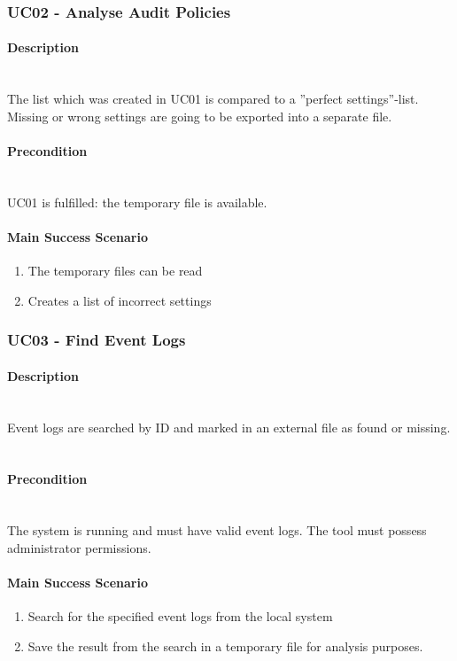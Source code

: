 \subsubsection{UC02 - Analyse Audit Policies}\label{UC02}
\begin{tcolorbox}
    \paragraph{Description} \ \\
    The list which was created in UC01 is compared to a ''perfect settings''-list. Missing or wrong settings are going to be exported into a separate file.
    \ \\
    \paragraph{Precondition} \ \\
    UC01 is fulfilled: the temporary file is available.
    \ \\
    \paragraph{Main Success Scenario} 
    \begin{enumerate}
        \item The temporary files can be read
        \item Creates a list of incorrect settings
    \end{enumerate}   
\end{tcolorbox}
\subsubsection{UC03 - Find Event Logs}\label{UC03}
\begin{tcolorbox}
    \paragraph{Description} \ \\
    Event logs are searched by ID and marked in an external file as found or missing.
    \ \\
    \paragraph{Precondition} \ \\
    The system is running and must have valid event logs. The tool must possess administrator permissions.
    \ \\
    \paragraph{Main Success Scenario} 
    \begin{enumerate}
        \item Search for the specified event logs from the local system
        \item Save the result from the search in a temporary file for analysis purposes.
    \end{enumerate}
\end{tcolorbox}


